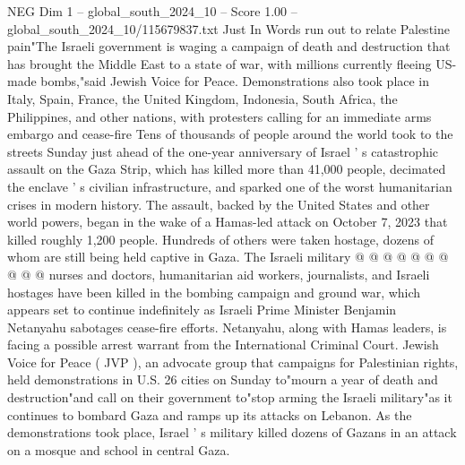 \begin{textsample}{NEG Dim 1 – global\_south\_2024\_10 – Score 1.00 – global\_south\_2024\_10/115679837.txt}  \label{ex:f1_neg_435}
Just In Words run out to relate Palestine pain"The Israeli government is waging a campaign of death and destruction that has brought the Middle East to a state of war, with millions currently fleeing US-made bombs,"said Jewish Voice for Peace.
Demonstrations also took place in Italy, Spain, France, the United Kingdom, Indonesia, South Africa, the Philippines, and other nations, with protesters calling for an immediate arms embargo and cease-fire Tens of thousands of people around the world took to the streets Sunday just ahead of the one-year anniversary of Israel ' s catastrophic assault on the Gaza Strip, which has killed more than 41,000 people, decimated the enclave ' s civilian infrastructure, and sparked one of the worst humanitarian crises in modern history.
The assault, backed by the United States and other world powers, began in the wake of a Hamas-led attack on October 7, 2023 that killed roughly 1,200 people.
Hundreds of others were taken hostage, dozens of whom are still being held captive in Gaza.
The Israeli military @ @ @ @ @ @ @ @ @ @ nurses and doctors, humanitarian aid workers, journalists, and Israeli hostages have been killed in the bombing campaign and ground war, which appears set to continue indefinitely as Israeli Prime Minister Benjamin Netanyahu sabotages cease-fire efforts.
Netanyahu, along with Hamas leaders, is facing a possible arrest warrant from the International Criminal Court.
Jewish Voice for Peace ( JVP ), an advocate group that campaigns for Palestinian rights, held demonstrations in U.S. 26 cities on Sunday to"mourn a year of death and destruction"and call on their government to"stop arming the Israeli military"as it continues to bombard Gaza and ramps up its attacks on Lebanon.
As the demonstrations took place, Israel ' s military killed dozens of Gazans in an attack on a mosque and school in central Gaza.

\end{textsample}
